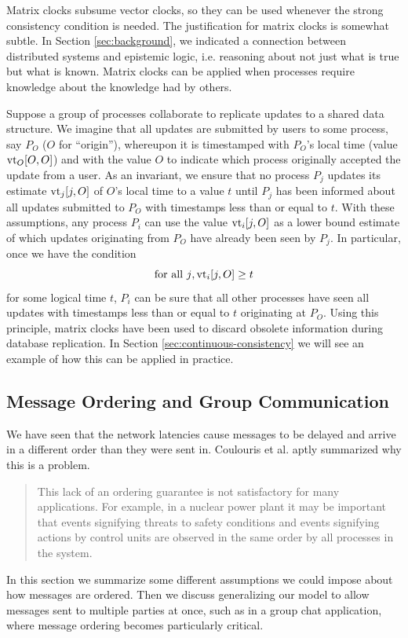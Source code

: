 \documentclass[]             %
{NASA}                       %
\theoremstyle{definition}
\begin{document}
Matrix clocks subsume vector clocks, so they can be used whenever the
strong consistency condition is needed. The justification for matrix
clocks is somewhat subtle. In Section \ref{sec:background}, we
indicated a connection between distributed systems and epistemic
logic, i.e. reasoning about not just what is true but what is
known. Matrix clocks can be applied when processes require knowledge
about the knowledge had by others.

Suppose a group of processes collaborate to replicate updates to a
shared data structure. We imagine that all updates are submitted by
users to some process, say $P_O$ ($O$ for ``origin''), whereupon it is
timestamped with $P_O$'s local time (value $\textrm{vt}_O[O,O]$) and with the
value $O$ to indicate which process originally accepted the update
from a user. As an invariant, we ensure that no process $P_j$ updates
its estimate $\textrm{vt}_j[j, O]$ of $O$'s local time to a value $t$ until
$P_j$ has been informed about all updates submitted to $P_O$ with
timestamps less than or equal to $t$. With these assumptions, any
process $P_i$ can use the value $\textrm{vt}_i[j, O]$ as a lower bound
estimate of which updates originating from $P_O$ have already been
seen by $P_j$. In particular, once we have the
condition
\[ \textrm{for all $j$}, \textrm{vt}_i[j, O] \geq t
\]
for some logical time $t$, $P_i$ can be sure that all other processes
have seen all updates with timestamps less than or equal to $t$
originating at $P_O$. Using this principle, matrix clocks have been
used to discard obsolete information during database replication. In
Section \ref{sec:continuous-consistency} we will see an example of how
this can be applied in practice.

\subsection{Message Ordering and Group Communication}
We have seen that the network latencies cause messages to be delayed
and arrive in a different order than they were sent in. Coulouris et
al. \cite{coulouris2005distributed} aptly summarized why this is a
problem.
\begin{quote}
  This lack of an ordering guarantee is not satisfactory for many
  applications. For example, in a nuclear power plant it may be
  important that events signifying threats to safety conditions and
  events signifying actions by control units are observed in the same
  order by all processes in the system.
\end{quote}
In this section we summarize some different assumptions we could
impose about how messages are ordered. Then we discuss generalizing
our model to allow messages sent to multiple parties at once, such as
in a group chat application, where message ordering becomes
particularly critical.
\end{document}
